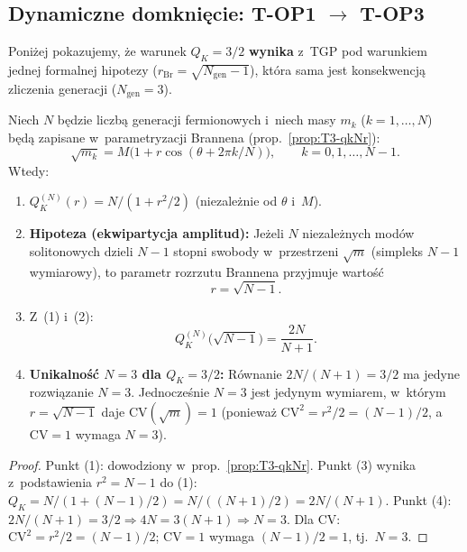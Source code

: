 \subsection{Dynamiczne domkni\k{e}cie: T-OP1 $\to$ T-OP3}%
\label{ssec:T-dynamic-closure}

Poni\.zej pokazujemy, \.ze warunek $Q_K = 3/2$
\textbf{wynika} z~TGP pod warunkiem jednej
formalnej hipotezy ($r_{\mathrm{Br}} = \sqrt{N_{\mathrm{gen}}-1}$),
kt\'ora sama jest konsekwencj\k{a} zliczenia generacji
($N_{\mathrm{gen}} = 3$).

\begin{theorem}[$Q_K = 3/2$ z~$N_{\mathrm{gen}} = 3$
  i~parametryzacji Brannena]%
\label{thm:T-QK-from-Ngen}
Niech $N$ b\k{e}dzie liczb\k{a} generacji fermionowych
i~niech masy $m_k$ ($k = 1,\ldots,N$) b\k{e}d\k{a}
zapisane w~parametryzacji Brannena
(prop.~\ref{prop:T3-qkNr}):
\[
  \sqrt{m_k} = M\bigl(1 + r\cos(\theta + 2\pi k/N)\bigr),
  \qquad k = 0, 1, \ldots, N-1.
\]
Wtedy:
\begin{enumerate}[nosep]
  \item $Q_K^{(N)}(r) = N/(1 + r^2/2)$ (niezale\.znie od $\theta$ i~$M$).

  \item \textbf{Hipoteza (ekwipartycja amplitud):}
    Je\.zeli $N$ niezale\.znych mod\'ow solitonowych dzieli
    $N-1$ stopni swobody w~przestrzeni $\sqrt{m}$
    (simpleks $N-1$ wymiarowy),
    to parametr rozrzutu Brannena przyjmuje warto\'s\'c
    \begin{equation}\label{eq:T-r-Brannen-N}
      r = \sqrt{N - 1}.
    \end{equation}

  \item Z~(1) i~(2):
    \begin{equation}\label{eq:T-QK-general-N}
      Q_K^{(N)}\!\bigl(\sqrt{N-1}\bigr) = \frac{2N}{N+1}.
    \end{equation}

  \item \textbf{Unikalno\'s\'c $N = 3$ dla $Q_K = 3/2$:}
    R\'ownanie $2N/(N+1) = 3/2$ ma jedyne
    rozwi\k{a}zanie $N = 3$. Jednocze\'snie $N = 3$
    jest jedynym wymiarem, w~kt\'orym
    $r = \sqrt{N-1}$ daje $\mathrm{CV}(\sqrt{m}) = 1$
    (poniewa\.z $\mathrm{CV}^2 = r^2/2 = (N-1)/2$,
    a~$\mathrm{CV} = 1$ wymaga $N = 3$).
\end{enumerate}
\end{theorem}

\begin{proof}
Punkt (1): dowodziony w~prop.~\ref{prop:T3-qkNr}.
Punkt (3) wynika z~podstawienia
$r^2 = N-1$ do (1):
$Q_K = N/(1 + (N-1)/2) = N/((N+1)/2) = 2N/(N+1)$.
Punkt (4): $2N/(N+1) = 3/2 \Rightarrow 4N = 3(N+1)
\Rightarrow N = 3$.
Dla $\mathrm{CV}$: $\mathrm{CV}^2 = r^2/2 = (N-1)/2$;
$\mathrm{CV} = 1$ wymaga $(N-1)/2 = 1$, tj.~$N = 3$.
\end{proof}

